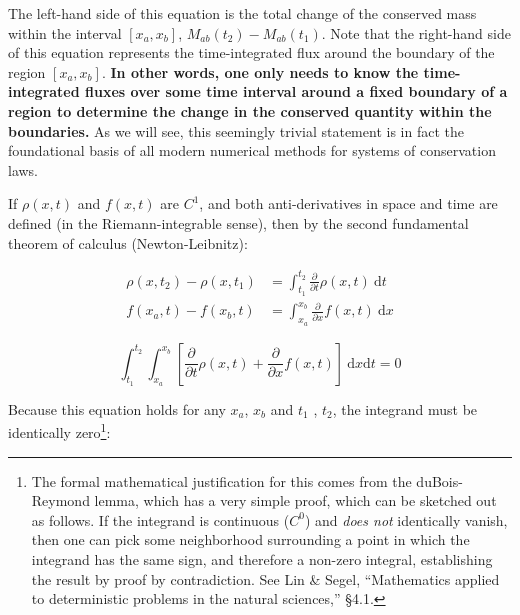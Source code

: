 \documentclass[notoc]{tufte-handout}
\begin{document}

The left-hand side of this equation is the total change of the conserved mass within the interval  $[x_a,x_b]$, $M_{ab}(t_2) - M_{ab}(t_1)$. Note that the right-hand side of this equation represents the time-integrated flux around the boundary of the region  $[x_a,x_b]$. {\bf In other words,  one only needs to know the time-integrated fluxes over some time interval around a fixed boundary of a region to determine the change in the conserved quantity within the boundaries.}  As we will see, this seemingly trivial statement is in fact the foundational basis of all modern numerical methods for systems of conservation laws.  

If $\rho (x, t)$ and $f (x, t)$ are $C^1$, and both anti-derivatives in space and time are defined (in the Riemann-integrable sense), then by the second fundamental  theorem of calculus (Newton-Leibnitz):

\begin{align}
\rho(x,t_2) - \rho(x,t_1) & = \int_{t_1}^{t_2} \frac{\partial}{\partial t}\rho(x,t)~\mathrm{d}t \\
f(x_a,t) - f(x_b,t) & = \int_{x_a}^{x_b}\frac{\partial}{\partial x}f(x,t)~\mathrm{d}x
\end{align}

\begin{equation}
\int_{t_1}^{t_2}\int_{x_a}^{x_b} \left[ \frac{\partial}{\partial t}\rho(x,t) + \frac{\partial}{\partial x}f(x,t)  \right]~\mathrm{d}x\mathrm{d}t = 0
\end{equation}

Because this equation holds for any $x_a$, $x_b$ and $t_1$ , $t_2$, the integrand must be identically zero\footnote{The formal mathematical justification for this comes from the duBois-Reymond lemma, which has a very simple proof, which can be sketched out as follows. If the integrand is continuous ($C^0$) and {\it does not} identically vanish, then one can pick some neighborhood surrounding a point in which the integrand has the same sign, and therefore a non-zero integral, establishing the result by proof by contradiction. See Lin \& Segel, ``Mathematics applied to deterministic problems in the natural sciences,'' \S 4.1.}:
\end{document}
